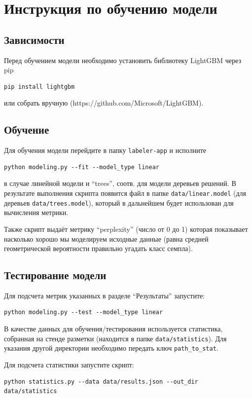 \documentclass[12pt]{article}
\begin{document}
\section{Инструкция по обучению модели}
\label{model-fit}

\subsection{Зависимости}
Перед обучением модели необходимо установить библиотеку LightGBM через pip
\begin{verbatim}
pip install lightgbm
\end{verbatim}
или собрать вручную (https://github.com/Microsoft/LightGBM).

\subsection{Обучение}
Для обучения модели перейдите в папку \texttt{labeler-app} и исполните
\begin{verbatim}
python modeling.py --fit --model_type linear
\end{verbatim}
в случае линейной модели и ``trees'', соотв. для модели деревьев решений.
В результате выполнения скрипта появится файл в папке \texttt{data/linear.model}
(для деревьев \texttt{data/trees.model}),
который в дальнейшем будет использован для вычисления метрики.

Также скрипт выдаёт метрику ``perplexity'' (число от 0 до 1) которая показывает насколько хорошо мы моделируем исходные данные (равна средней геометрической вероятности правильно угадать класс семпла).

\subsection{Тестирование модели}
Для подсчета метрик указанных в разделе ``Результаты'' запустите:
\begin{verbatim}
python modeling.py --test --model_type linear
\end{verbatim}

В качестве данных для обучения/тестирования используется статистика, собранная на стенде разметки (находится в папке \texttt{data/statistics}). Для указания другой директории необходимо передать ключ \texttt{\-\-path\_to\_stat}.

Для подсчета статистики запустите скрипт:
{\small
\begin{verbatim}
python statistics.py --data data/results.json --out_dir data/statistics
\end{verbatim}
}
\end{document}
